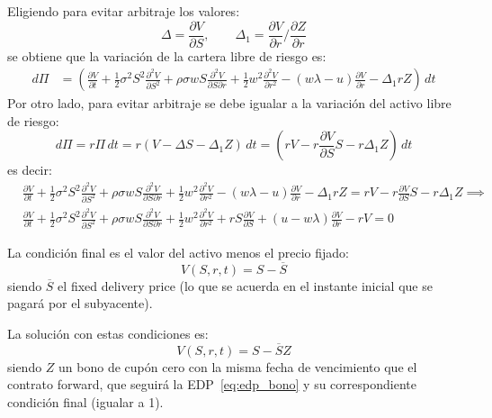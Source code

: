 Eligiendo para evitar arbitraje los valores:
\begin{equation*}
    \Delta = \frac{\partial V}{\partial S}, \qquad \Delta_1 = \frac{\partial V}{\partial r} / \frac{\partial Z}{\partial r}
\end{equation*}
se obtiene que la variación de la cartera libre de riesgo es:
\begin{align*}
    d\Pi &= \left( \frac{\partial V}{\partial t} + \frac{1}{2} \sigma^2 S^2 \frac{\partial^2 V}{\partial S^2} + \rho\sigma w S \frac{\partial^2 V}{\partial S \partial r} + \frac{1}{2} w^2 \frac{\partial^2 V}{\partial r^2} - (w\lambda - u) \frac{\partial V}{\partial r} - \Delta_1 rZ  \right)\,dt
\end{align*}
Por otro lado, para evitar arbitraje se debe igualar a la variación del activo libre de riesgo:
\begin{equation*}
    d\Pi = r \Pi\,dt = r \left( V - \Delta S - \Delta_1 Z \right)\,dt = \left( rV - r\frac{\partial V}{\partial S} S - r\Delta_1 Z \right)\,dt
\end{equation*}
es decir:
\begin{align*}
    &\frac{\partial V}{\partial t} + \frac{1}{2} \sigma^2 S^2 \frac{\partial^2 V}{\partial S^2} + \rho\sigma w S \frac{\partial^2 V}{\partial S \partial r} + \frac{1}{2} w^2 \frac{\partial^2 V}{\partial r^2} - (w\lambda - u) \frac{\partial V}{\partial r} - \Delta_1 rZ = rV - r\frac{\partial V}{\partial S} S - r\Delta_1 Z \implies \\
    &\boxed{\frac{\partial V}{\partial t} + \frac{1}{2} \sigma^2 S^2 \frac{\partial^2 V}{\partial S^2} + \rho\sigma w S \frac{\partial^2 V}{\partial S \partial r} + \frac{1}{2} w^2 \frac{\partial^2 V}{\partial r^2} + r S \frac{\partial V}{\partial S} + (u - w\lambda) \frac{\partial V}{\partial r} - rV = 0}
\end{align*}

La condición final es el valor del activo menos el precio fijado:
\begin{equation*}
    \boxed{V(S,r,t) = S - \overline{S}}
\end{equation*}
siendo $\overline{S}$ el fixed delivery price (lo que se acuerda en el instante inicial que se pagará por el subyacente).

La solución con estas condiciones es:
\begin{equation*}
    \boxed{V(S,r,t) = S - \overline{S} Z}
\end{equation*}
siendo $Z$ un bono de cupón cero con la misma fecha de vencimiento que el contrato forward, que seguirá la EDP~\eqref{eq:edp_bono} y su correspondiente condición final (igualar a 1).

